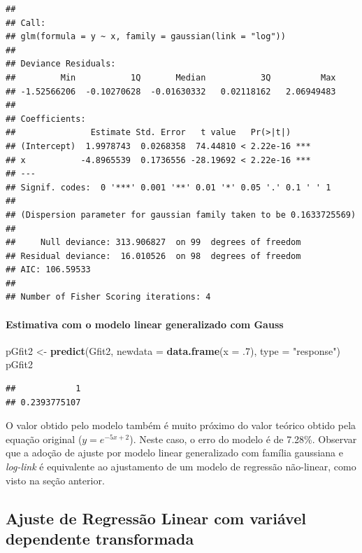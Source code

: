 \documentclass[a4paper]{article}
\newenvironment{Shaded}{\begin{snugshade}}{\end{snugshade}}
\newcommand{\KeywordTok}[1]{\textcolor[rgb]{0.13,0.29,0.53}{\textbf{#1}}}
\newcommand{\DataTypeTok}[1]{\textcolor[rgb]{0.13,0.29,0.53}{#1}}
\newcommand{\DecValTok}[1]{\textcolor[rgb]{0.00,0.00,0.81}{#1}}
\newcommand{\StringTok}[1]{\textcolor[rgb]{0.31,0.60,0.02}{#1}}
\newcommand{\NormalTok}[1]{#1}
\let\oldparagraph\paragraph
\renewcommand{\paragraph}[1]{\oldparagraph{#1}\mbox{}}
\begin{document}
\begin{verbatim}
## 
## Call:
## glm(formula = y ~ x, family = gaussian(link = "log"))
## 
## Deviance Residuals: 
##         Min           1Q       Median           3Q          Max  
## -1.52566206  -0.10270628  -0.01630332   0.02118162   2.06949483  
## 
## Coefficients:
##               Estimate Std. Error   t value   Pr(>|t|)    
## (Intercept)  1.9978743  0.0268358  74.44810 < 2.22e-16 ***
## x           -4.8965539  0.1736556 -28.19692 < 2.22e-16 ***
## ---
## Signif. codes:  0 '***' 0.001 '**' 0.01 '*' 0.05 '.' 0.1 ' ' 1
## 
## (Dispersion parameter for gaussian family taken to be 0.1633725569)
## 
##     Null deviance: 313.906827  on 99  degrees of freedom
## Residual deviance:  16.010526  on 98  degrees of freedom
## AIC: 106.59533
## 
## Number of Fisher Scoring iterations: 4
\end{verbatim}

\paragraph{Estimativa com o modelo linear generalizado com
Gauss}\label{estimativa-com-o-modelo-linear-generalizado-com-gauss}

\begin{Shaded}
\begin{Highlighting}[]
\NormalTok{pGfit2 <-}\StringTok{ }\KeywordTok{predict}\NormalTok{(Gfit2, }\DataTypeTok{newdata =} \KeywordTok{data.frame}\NormalTok{(}\DataTypeTok{x =}\NormalTok{ .}\DecValTok{7}\NormalTok{), }\DataTypeTok{type =} \StringTok{"response"}\NormalTok{)}
\NormalTok{pGfit2}
\end{Highlighting}
\end{Shaded}

\begin{verbatim}
##            1 
## 0.2393775107
\end{verbatim}

O valor obtido pelo modelo também é muito próximo do valor teórico
obtido pela equação original (\(y = e^{-5x + 2}\)). Neste caso, o erro
do modelo é de 7.28\%. Observar que a adoção de ajuste por modelo linear
generalizado com família gaussiana e \emph{log-link} é equivalente ao
ajustamento de um modelo de regressão não-linear, como visto na seção
anterior.

\subsection{Ajuste de Regressão Linear com variável dependente
transformada}\label{ajuste-de-regressao-linear-com-variavel-dependente-transformada}
\end{document}
